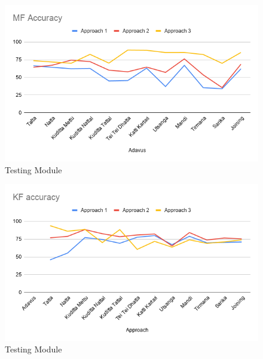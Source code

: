 \begin{figure}[H]
    \hspace{-2.5cm}
    \includegraphics[scale= 0.8]{./Pictures/mf.png}
    \caption{Testing Module}
    \label{fig:Ch06F004}
\end{figure}

\begin{figure}[H]
    \hspace{-2.5cm}
    \includegraphics[scale= 0.8]{./Pictures/kf.png}
    \caption{Testing Module}
    \label{fig:Ch06F005}
\end{figure}






